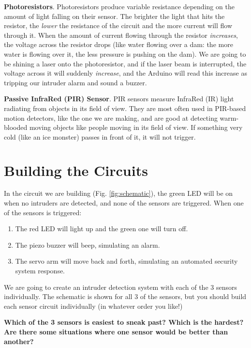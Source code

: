 \documentclass{article}
\begin{document}
\textbf{Photoresistors}. Photoresistors produce variable resistance depending on the
amount of light falling on their sensor. The brighter the light that hits the
resistor, the \emph{lower} the resistance of the circuit and the more current will
flow through it. When the amount of current flowing through the resistor
\emph{increases}, the voltage across the resistor drops (like water flowing over a
dam: the more water is flowing over it, the less pressure is pushing on the
dam). We are going to be shining a laser onto the photoresistor, and if the laser
beam is interrupted, the voltage across it will suddenly \emph{increase}, and the
Arduino will read this increase as tripping our intruder alarm and sound a buzzer.

\textbf{Passive InfraRed (PIR) Sensor}. PIR sensors measure InfraRed (IR) light
radiating from objects in its field of view. They are most often used in PIR-based
motion detectors, like the one we are making, and are good at detecting warm-blooded
moving objects like people moving in its field of view. If something very cold (like
an ice monster) passes in front of it, it will not trigger.


\newpage
\section{Building the Circuits}
In the circuit we are building (Fig. \ref{fig:schematic}), the green LED will be on
when no intruders are detected, and none of the sensors are triggered. When one of
the sensors is triggered:

\begin{enumerate}
\item {The red LED will light up and the green one will turn off.}
\item {The piezo buzzer will beep, simulating an alarm.}
\item {The servo arm will move back and forth, simulating an automated security
    system response.}
\end{enumerate}

We are going to create an intruder detection system with each of the 3 sensors
individually. The schematic is shown for all 3 of the sensors, but you should build
each sensor circuit individually (in whatever order you like!)

\textbf{Which of the 3 sensors is easiest to sneak past? Which is the hardest? Are
  there some situations where one sensor would be better than another?}
\end{document}
